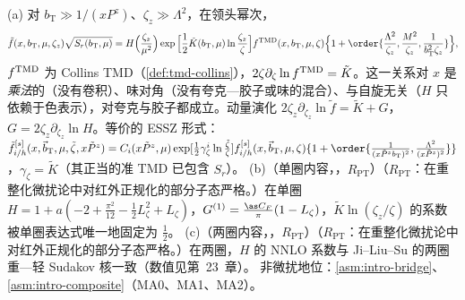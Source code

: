 \begin{theorem}\label{thm:lamet-quasi-tmd}
(a) 对 $b_{\mathrm T}\gg1/(xP^z)$、$\zeta_z\gg\Lambda^2$，在领头幂次，
\begin{equation}\label{eq:lamet-qtmd}
\tilde f(x,b_{\mathrm T},\mu,\zeta_z)\sqrt{S_r(b_{\mathrm T},\mu)}=H\Big(\frac{\zeta_z}{\mu^2}\Big)\exp\Big[\frac12\tilde K(b_{\mathrm T},\mu)\ln\frac{\zeta_z}\zeta\Big]f^{\rm TMD}(x,b_{\mathrm T},\mu,\zeta)\Big\{1+\order{\frac{\Lambda^2}{\zeta_z},\frac{M^2}{\zeta_z},\frac1{b_{\mathrm T}^2\zeta_z}}\Big\},
\end{equation}%
$f^{\rm TMD}$ 为 Collins TMD（\cref{def:tmd-collins}），$2\zeta\partial_\zeta\ln f^{\rm TMD}=\tilde K$。这一关系对 $x$ 是\emph{乘法}的（没有卷积）、味对角（没有夸克—胶子或味的混合）、与自旋无关（$H$ 只依赖于色表示），对夸克与胶子都成立。动量演化 $2\zeta_z\partial_{\zeta_z}\ln\tilde f=\tilde K+G$，$G=2\zeta_z\partial_{\zeta_z}\ln H$。等价的 ESSZ 形式：$\tilde f^{[s]}_{i/h}(x,\vec b_{\mathrm T},\mu,\tilde\zeta,x\tilde P^z)=C_i(x\tilde P^z,\mu)\exp[\frac12\gamma^i_\zeta\ln\frac{\tilde\zeta}\zeta]f^{[s]}_{i/h}(x,\vec b_{\mathrm T},\mu,\zeta)\{1+\order{\frac1{(x\tilde P^zb_{\mathrm T})^2},\frac{\Lambda^2}{(x\tilde P^z)^2}}\}$，$\gamma_\zeta=\tilde K$（其正当的准 TMD 已包含 $S_r$）。
(b)（单圈内容，\tagR，$R_{\mathrm{PT}}$）（$R_{\mathrm{PT}}$：在重整化微扰论中对红外正规化的部分子态严格。）在单圈 $H=1+a(-2+\frac{\pi^2}{12}-\frac12L_\zeta^2+L_\zeta)$，$G^{(1)}=\frac{\as C_F}\pi(1-L_\zeta)$，$\tilde K\ln(\zeta_z/\zeta)$ 的系数被单圈表达式唯一地固定为 $\frac12$。
(c)（两圈内容，\tagR，$R_{\mathrm{PT}}$）（$R_{\mathrm{PT}}$：在重整化微扰论中对红外正规化的部分子态严格。）在两圈，$H$ 的 NNLO 系数\cite{delRio:2023pse}与 Ji--Liu--Su 的两圈重—轻 Sudakov 核一致（数值见第~23~章）。
非微扰地位：\cref{asm:intro-bridge}、\cref{asm:intro-composite}（MA0、MA1、MA2）。
\end{theorem}

